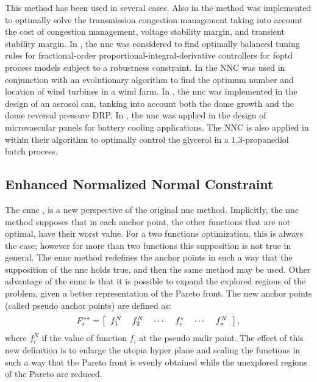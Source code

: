 This method has been used in several cases. Also in \cite{Hosseini2016a} the method was implemented to optimally solve the transmission congestion management taking into account the cost of congestion management, voltage stability margin, and transient stability margin. In \cite{Sanchez2017a}, the \gls{nnc} was considered to find optimally balanced tuning rules for fractional-order proportional-integral-derivative controllers for \gls{foptd} process models subject to a robustness constraint. In \cite{Mittal2017a} the NNC was used in conjunction with an evolutionary algorithm to find the optimum number and location of wind turbines in a wind farm. In \cite{Benki2018}, the \gls{nnc} was implemented in the design of an aerosol can, tanking into account both the dome growth and the dome reversal pressure DRP. In \cite{Tan2018a}, the \gls{nnc} was applied in the design of microvascular panels for battery cooling applications. The NNC is also applied in \cite{Liu2019} within their algorithm to optimally control the glycerol in a 1,3-propanediol batch process.

\subsection{Enhanced Normalized Normal Constraint}
\label{sec:ENNC}
The \gls{ennc} \cite{Sanchis2008}, is a new perspective of the original \gls{nnc} method. Implicitly, the \gls{nnc} method supposes that in each anchor point, the other functions that are not optimal, have their worst value. For a two functions optimization, this is always the case; however for more than two functions this supposition is not true in general. The \gls{ennc} method redefines the anchor points in such a way that the supposition of the \gls{nnc} holds true, and then the same method may be used. Other advantage of the \gls{ennc} is that it is possible to expand the explored regions of the problem, given a better representation of the Pareto front.
%
The new anchor points (called pseudo anchor points) are defined as:
\begin{equation}
F_i^{**} = \left[
\begin{tabular}{cccccc}
$f_1^N$ & $f_2^N$ & $\cdots$ & $f_i^{*}$ & $\cdots$ & $f_n^N$
\end{tabular}
\right],
\label{eq:PseudoAnchor}
\end{equation}
%
where $f_i^N$ if the value of function $f_i$ at the pseudo nadir point. The effect of this new definition is to enlarge the utopia hyper plane and scaling the functions in such a way that the Pareto front is evenly obtained while the unexplored regions of the Pareto are reduced.

